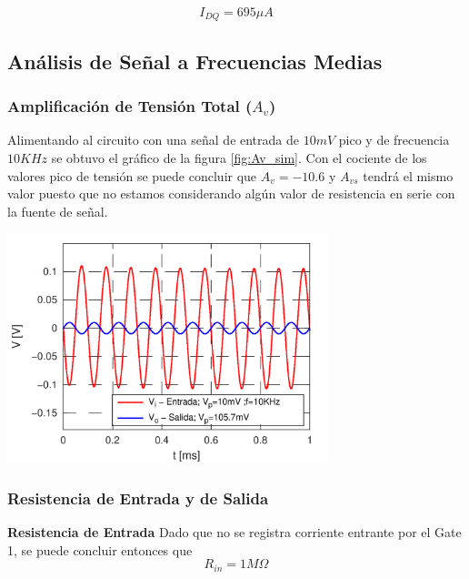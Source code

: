 \documentclass[a4paper, 10pt, spanish]{article}
\begin{document}
\begin{equation}
  I_{DQ} = 695 \mu A
\end{equation}

\subsection{Análisis de Señal a Frecuencias Medias}

\subsubsection{Amplificación de Tensión Total ($A_v$)}
Alimentando al circuito con una señal de entrada de $10mV$ pico y de frecuencia $10KHz$ se obtuvo el gráfico de la figura \ref{fig:Av_sim}. Con el cociente de los valores pico de tensión se puede concluir que $A_v=-10.6$ y $A_{vs}$ tendrá el mismo valor puesto que no estamos considerando algún valor de resistencia en serie con la fuente de señal.

\begin{center}
  \includegraphics[width=0.7\textwidth]{Av_sim.png}
  \label{fig:Av_sim}
\end{center}

\subsubsection{Resistencia de Entrada y de Salida}
\textbf{Resistencia de Entrada}
Dado que no se registra corriente entrante por el Gate 1, se puede concluir entonces que
\begin{equation}
  R_{in} = 1M\Omega
\end{equation}
\end{document}
